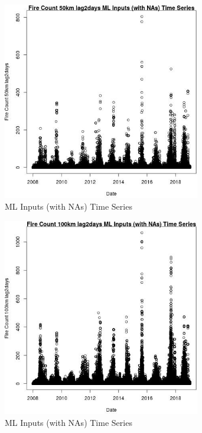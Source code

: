 \begin{figure} 
\centering  
\includegraphics[width=0.77\textwidth]{Code_Outputs/Report_ML_input_PM25_Step4_part_f_de_duplicated_aveswNAs_Fire_Count_50km_lag2daysvDate.jpg} 
\caption{\label{fig:Report_ML_input_PM25_Step4_part_f_de_duplicated_aveswNAsFire_Count_50km_lag2daysvDate}ML Inputs (with NAs) Time Series} 
\end{figure} 
 

\begin{figure} 
\centering  
\includegraphics[width=0.77\textwidth]{Code_Outputs/Report_ML_input_PM25_Step4_part_f_de_duplicated_aveswNAs_Fire_Count_100km_lag2daysvDate.jpg} 
\caption{\label{fig:Report_ML_input_PM25_Step4_part_f_de_duplicated_aveswNAsFire_Count_100km_lag2daysvDate}ML Inputs (with NAs) Time Series} 
\end{figure} 
 

